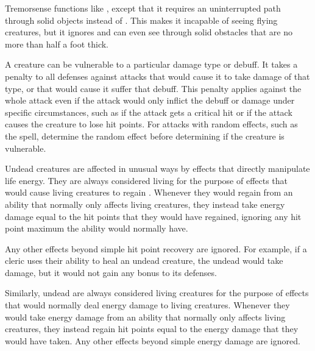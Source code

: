         Tremorsense functions like , except that it requires an uninterrupted path through solid objects instead of .
        This makes it incapable of seeing flying creatures, but it ignores  and can even see through solid obstacles that are no more than half a foot thick.

        A creature can be vulnerable to a particular damage type or debuff.
        It takes a  penalty to all defenses against attacks that would cause it to take damage of that type, or that would cause it suffer that debuff.
        This penalty applies against the whole attack even if the attack would only inflict the debuff or damage under specific circumstances, such as if the attack gets a critical hit or if the attack causes the creature to lose hit points.
        For attacks with random effects, such as the  spell, determine the random effect before determining if the creature is vulnerable.

        Undead creatures are affected in unusual ways by effects that directly manipulate life energy.
        They are always considered living  for the purpose of effects that would cause living creatures to regain .
        Whenever they would regain  from an ability that normally only affects living creatures, they instead take energy damage equal to the hit points that they would have regained, ignoring any hit point maximum the ability would normally have.

        Any other effects beyond simple hit point recovery are ignored.
        For example, if a cleric uses their  ability to heal an undead creature, the undead would take damage, but it would not gain any bonus to its defenses.

        Similarly, undead are always considered living creatures for the purpose of effects that would normally deal energy damage to living creatures.
        Whenever they would take energy damage from an ability that normally only affects living creatures, they instead regain hit points equal to the energy damage that they would have taken. 
        Any other effects beyond simple energy damage are ignored.
